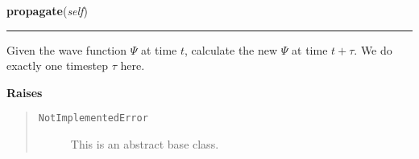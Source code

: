 \hspace{.8\funcindent}\begin{boxedminipage}{\funcwidth}

    \raggedright \textbf{propagate}(\textit{self})

    \vspace{-1.5ex}

    \rule{\textwidth}{0.5\fboxrule}
\setlength{\parskip}{2ex}
    Given the wave function $\Psi$ at time $t$, calculate
    the new $\Psi$ at time $t + \tau$. We do exactly
    one timestep $\tau$ here.

\setlength{\parskip}{1ex}
      \textbf{Raises}
    \vspace{-1ex}

      \begin{quote}
        \begin{description}

          \item[\texttt{NotImplementedError}]

          This is an abstract base class.

        \end{description}

      \end{quote}

    \end{boxedminipage}
